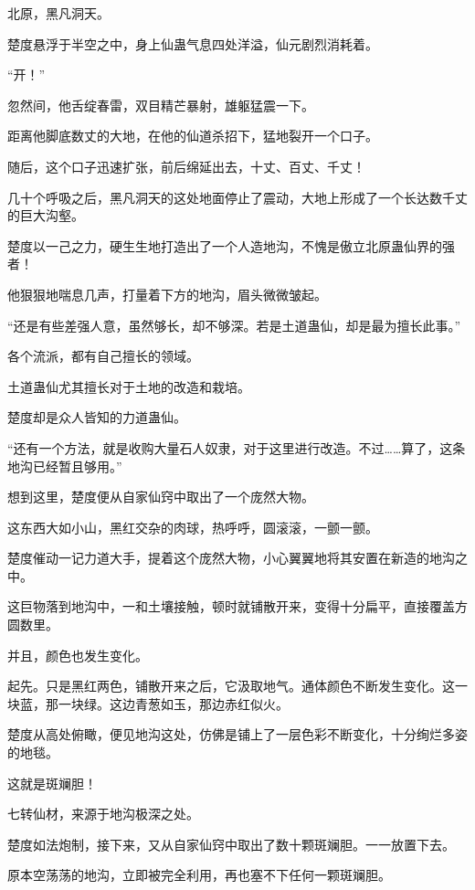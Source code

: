 
\begin{this_body}

北原，黑凡洞天。

楚度悬浮于半空之中，身上仙蛊气息四处洋溢，仙元剧烈消耗着。

“开！”

忽然间，他舌绽春雷，双目精芒暴射，雄躯猛震一下。

距离他脚底数丈的大地，在他的仙道杀招下，猛地裂开一个口子。

随后，这个口子迅速扩张，前后绵延出去，十丈、百丈、千丈！

几十个呼吸之后，黑凡洞天的这处地面停止了震动，大地上形成了一个长达数千丈的巨大沟壑。

楚度以一己之力，硬生生地打造出了一个人造地沟，不愧是傲立北原蛊仙界的强者！

他狠狠地喘息几声，打量着下方的地沟，眉头微微皱起。

“还是有些差强人意，虽然够长，却不够深。若是土道蛊仙，却是最为擅长此事。”

各个流派，都有自己擅长的领域。

土道蛊仙尤其擅长对于土地的改造和栽培。

楚度却是众人皆知的力道蛊仙。

“还有一个方法，就是收购大量石人奴隶，对于这里进行改造。不过……算了，这条地沟已经暂且够用。”

想到这里，楚度便从自家仙窍中取出了一个庞然大物。

这东西大如小山，黑红交杂的肉球，热呼呼，圆滚滚，一颤一颤。

楚度催动一记力道大手，提着这个庞然大物，小心翼翼地将其安置在新造的地沟之中。

这巨物落到地沟中，一和土壤接触，顿时就铺散开来，变得十分扁平，直接覆盖方圆数里。

并且，颜色也发生变化。

起先。只是黑红两色，铺散开来之后，它汲取地气。通体颜色不断发生变化。这一块蓝，那一块绿。这边青葱如玉，那边赤红似火。

楚度从高处俯瞰，便见地沟这处，仿佛是铺上了一层色彩不断变化，十分绚烂多姿的地毯。

这就是斑斓胆！

七转仙材，来源于地沟极深之处。

楚度如法炮制，接下来，又从自家仙窍中取出了数十颗斑斓胆。一一放置下去。

原本空荡荡的地沟，立即被完全利用，再也塞不下任何一颗斑斓胆。


\end{this_body}
